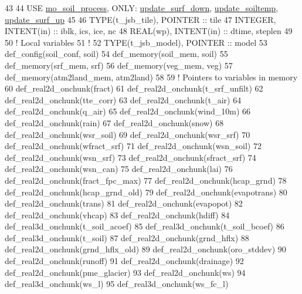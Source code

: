 \begin{DoxyCode}
43 
44     \textcolor{keywordtype}{USE }\hyperlink{namespacemo__soil__process}{mo\_soil\_process}\textcolor{keywordtype}{, ONLY}: \hyperlink{namespacemo__soil__process_a7dd6c425ac02aef924fb1fa3de6b373d}{update\_surf\_down}, 
      \hyperlink{namespacemo__soil__process_a9f2a04bdb962c1615ee419e1c62d6870}{update\_soiltemp}, \hyperlink{namespacemo__soil__process_a6baae437b29f7d04d8bb10cb1d52249f}{update\_surf\_up}
45 
46     \textcolor{keywordtype}{TYPE}(t\_jsb\_tile),  \textcolor{keywordtype}{POINTER}    :: tile
47     \textcolor{keywordtype}{INTEGER},           \textcolor{keywordtype}{INTENT(in)} :: iblk, ics, ice, nc
48     \textcolor{keywordtype}{REAL(wp)},          \textcolor{keywordtype}{INTENT(in)} :: dtime, steplen
49 
50     \textcolor{comment}{! Local variables}
51     \textcolor{comment}{!}
52     \textcolor{keywordtype}{TYPE}(t\_jsb\_model), \textcolor{keywordtype}{POINTER}    :: model
53     def\_config(soil\_conf, soil)
54     def\_memory(soil\_mem, soil)
55     def\_memory(srf\_mem, srf)
56     def\_memory(veg\_mem, veg)
57     def\_memory(atm2land\_mem, atm2land)
58 
59     \textcolor{comment}{! Pointers to variables in memory}
60     def\_real2d\_onchunk(fract)
61     def\_real2d\_onchunk(t\_srf\_unfilt)
62     def\_real2d\_onchunk(tte\_corr)
63     def\_real2d\_onchunk(t\_air)
64     def\_real2d\_onchunk(q\_air)
65     def\_real2d\_onchunk(wind\_10m)
66     def\_real2d\_onchunk(rain)
67     def\_real2d\_onchunk(snow)
68     def\_real2d\_onchunk(wsr\_soil)
69     def\_real2d\_onchunk(wsr\_srf)
70     def\_real2d\_onchunk(wfract\_srf)
71     def\_real2d\_onchunk(wsn\_soil)
72     def\_real2d\_onchunk(wsn\_srf)
73     def\_real2d\_onchunk(sfract\_srf)
74     def\_real2d\_onchunk(wsn\_can)
75     def\_real2d\_onchunk(lai)
76     def\_real2d\_onchunk(fract\_fpc\_max)
77     def\_real2d\_onchunk(hcap\_grnd)
78     def\_real2d\_onchunk(hcap\_grnd\_old)
79     def\_real2d\_onchunk(evapotrans)
80     def\_real2d\_onchunk(trans)
81     def\_real2d\_onchunk(evapopot)
82     def\_real2d\_onchunk(vhcap)
83     def\_real2d\_onchunk(hdiff)
84     def\_real3d\_onchunk(t\_soil\_acoef)
85     def\_real3d\_onchunk(t\_soil\_bcoef)
86     def\_real3d\_onchunk(t\_soil)
87     def\_real2d\_onchunk(grnd\_hflx)
88     def\_real2d\_onchunk(grnd\_hflx\_old)
89     def\_real2d\_onchunk(oro\_stddev)
90     def\_real2d\_onchunk(runoff)
91     def\_real2d\_onchunk(drainage)
92     def\_real2d\_onchunk(pme\_glacier)
93     def\_real2d\_onchunk(ws)
94     def\_real3d\_onchunk(ws\_l)
95     def\_real3d\_onchunk(ws\_fc\_l)

\end{DoxyCode}

